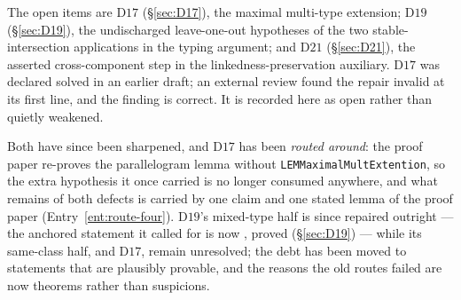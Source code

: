 The open items are $\mathrm{D}17$ (\S\ref{sec:D17}), the maximal multi-type
extension; $\mathrm{D}19$ (\S\ref{sec:D19}), the undischarged
leave-one-out hypotheses of the two stable-intersection applications in the
typing argument; and $\mathrm{D}21$ (\S\ref{sec:D21}), the asserted
cross-component step in the linkedness-preservation auxiliary.
$\mathrm{D}17$ was declared solved in an earlier draft; an
external review found the repair invalid at its first line, and the finding is
correct. It is recorded here as open rather than quietly weakened.

Both have since been sharpened, and $\mathrm{D}17$ has been \emph{routed
around}: the proof paper re-proves the parallelogram lemma without
\texttt{LEMMaximalMultExtention}, so the extra hypothesis it once carried is
no longer consumed anywhere, and what remains of both defects is carried by
one claim and one stated lemma of the proof paper
(Entry~\ref{ent:route-four}). $\mathrm{D}19$'s mixed-type half is since
repaired outright --- the anchored statement it called for is now
, proved (\S\ref{sec:D19}) --- while its
same-class half, and $\mathrm{D}17$, remain unresolved; the debt has been
moved to statements that are plausibly provable, and the reasons the old
routes failed are now theorems rather than suspicions.
